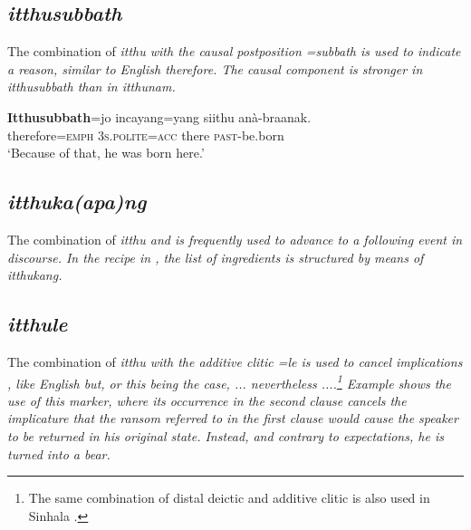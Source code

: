 \subsection{\em itthusubbath\em}\label{sec:wofo:itthusubbath}
The combination of \em itthu \em with the causal postposition \em =subbath \em is used to indicate a reason, similar to English \em therefore\em. The causal component is stronger in \em itthusubbath \em than in \em itthunam\em.

\ea
\gll \textbf{Itthusubbath}=jo incayang=yang    siithu anà-braanak. \\
  therefore=\textsc{emph} \textsc{3s.polite}=\textsc{acc} there \textsc{past}-be.born   \\
    `Because of that, he was born here.'
\z


\subsection{\em itthuka(apa)ng\em}\label{sec:wofo:itthuka(apa)ng}

The combination of \em itthu \em and  is frequently used to advance to a following event in discourse. In the recipe in , the list of ingredients is structured by means of \em itthukang\em.


\subsection{\em itthule\em}\label{sec:wofo:itthule}

The combination of \em itthu \em with the additive clitic \em =le \em is used to cancel implications , like English \em but\em, or \em this being the case, ... nevertheless ...\em.\footnote{The same combination of distal deictic and additive clitic is also used in Sinhala \citep[55]{Jayawardena2004}.} Example  shows the use of this marker, where its occurrence in the second clause cancels the implicature that the ransom referred to in the first clause would cause the speaker to be returned in his original state. Instead, and contrary to expectations,  he is turned into a bear.

